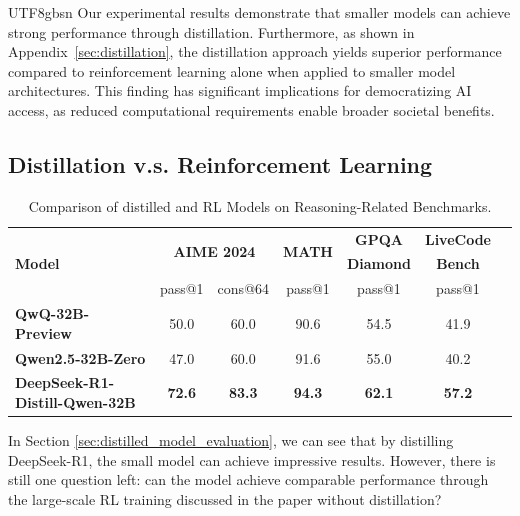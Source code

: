\documentclass[11pt, a4paper, logo, copyright, nonumbering]{deepseek}
\begin{document}
\begin{CJK*}{UTF8}{gbsn}
Our experimental results demonstrate that smaller models can achieve strong performance through distillation. Furthermore, as shown in Appendix~\ref{sec:distillation}, the distillation approach yields superior performance compared to reinforcement learning alone when applied to smaller model architectures. This finding has significant implications for democratizing AI access, as reduced computational requirements enable broader societal benefits.

\subsection{Distillation v.s. Reinforcement Learning} 
\begin{table}[h]
    \centering
    \caption{Comparison of distilled and RL Models on Reasoning-Related Benchmarks.}
    \label{tab:distill_vs_rl}
            \begin{tabular}{@{}l *{6}{c} @{}}
                \toprule
                \multirow{3}{*}{\centering\textbf{Model}} & \multicolumn{2}{c}{\multirow{2}{*}{\textbf{\footnotesize{AIME 2024}}}} & \multirow{2}{*}{\textbf{\footnotesize{MATH}}} & \textbf{\footnotesize{GPQA}} & \textbf{\footnotesize{LiveCode}} \\
                    &  &  &  & \textbf{\footnotesize{Diamond}} & \textbf{\footnotesize{Bench}} \\
        \cmidrule(lr){2-3}
         & pass@1 & cons@64 & pass@1 & pass@1 & pass@1 \\
                    
                \midrule
                \textbf{QwQ-32B-Preview} 
                    & 50.0 & 60.0 & 90.6 & 54.5 & 41.9  \\
                \textbf{Qwen2.5-32B-Zero} 
                    & 47.0 & 60.0 & 91.6 & 55.0 & 40.2  \\
                \textbf{DeepSeek-R1-Distill-Qwen-32B} 
                    & \bf{72.6} & \bf{83.3} & \bf{94.3} & \bf{62.1} & \bf{57.2} \\
                \bottomrule
            \end{tabular}
\end{table}

In Section \ref{sec:distilled_model_evaluation}, we can see that by distilling DeepSeek-R1, the small model can achieve impressive results. However, there is still one question left: can the model achieve comparable performance through the large-scale RL training discussed in the paper without distillation?


\end{CJK*}
\end{document}
